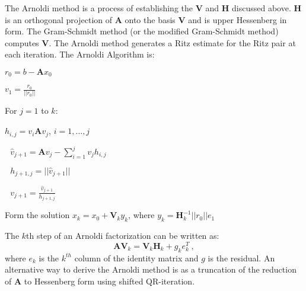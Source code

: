 \documentclass[12pt]{article}
\newcommand{\ve}[1]{\ensuremath{\mathbf{#1}}}
\begin{document}
The Arnoldi method is a process of establishing the $\ve{V}$ and $\ve{H}$ discussed above. %
 $\ve{H}$ is an orthogonal projection of $\ve{A}$ onto the basis $\ve{V}$ and is upper Hessenberg in form. The Gram-Schmidt method (or the modified Gram-Schmidt method) computes $\ve{V}$. The Arnoldi method generates a Ritz estimate for the Ritz pair at each iteration. 
The Arnoldi Algorithm is:            
%
\begin{list}{}{}
  \item $r_0 = b - \ve{A}x_0$ 
  \item $v_1 = \frac{r_0}{||r_0||}$ 
  \item For $j = 1$ to $k$: 
  \begin{list}{}{\hspace{2em}}
    \item $h_{i,j} = v_i \ve{A} v_j$, $i = 1, \dots, j$ 
    \item $\text{ } \hat{v}_{j+1} = \ve{A}v_j - \sum_{i=1}^{j} v_j h_{i,j}$ 
    \item $\text{ } h_{j+1,j} = ||\hat{v}_{j+1}||$ 
    \item $\text{ } v_{j+1} = \frac{\hat{v}_{j+1}} {h_{j+1,j}}$ 
  \end{list}
  \item Form the solution $x_k = x_0 + \ve{V}_k y_k$, where $y_k = \ve{H}_k^{-1} ||r_0|| e_1$
\end{list}

The $k$th step of an Arnoldi factorization can be written as: 
%
\begin{equation}
  \ve{AV}_{k} = \ve{V}_{k}\ve{H}_{k} + g_{k}e_{k}^{T} \:,
\end{equation} 
%
where $e_{k}$ is the $k^{th}$ column of the identity matrix and $g$ is the residual. An alternative way to derive the Arnoldi method is as a truncation of the reduction of $\ve{A}$ to Hessenberg form using shifted QR-iteration.%
\end{document}
